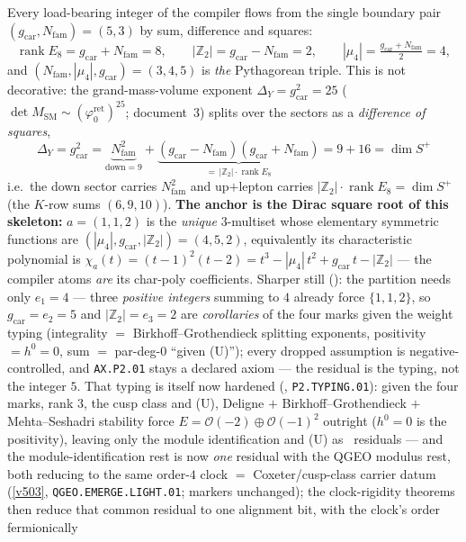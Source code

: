 \documentclass[11pt,a4paper]{article}
\newcommand{\gcar}{g_{\mathrm{car}}}
\newcommand{\Nfam}{N_{\mathrm{fam}}}
\newcommand{\phiz}{\varphi_0^{\mathrm{ret}}}
\newcommand{\Z}{\mathbb{Z}}
\theoremstyle{definition}
\begin{document}
\begin{keybox}[The whole integer skeleton from one pair $(\gcar,\Nfam)=(5,3)$ \mE\ (\veri{v53\_compiler\_core.py})]
Every load-bearing integer of the compiler flows from the single boundary pair
$(\gcar,\Nfam)=(5,3)$ by sum, difference and squares:
\[
  \operatorname{rank}E_8=\gcar{+}\Nfam=8,\qquad
  |\Z_2|=\gcar{-}\Nfam=2,\qquad
  |\mu_4|=\tfrac{\gcar+\Nfam}{2}=4,
\]
and $(\Nfam,|\mu_4|,\gcar)=(3,4,5)$ is \emph{the} Pythagorean triple. This is not decorative: the
grand-mass-volume exponent $\Delta_Y=\gcar^2=25$ ($\det M_{\mathrm{SM}}\sim(\phiz)^{25}$; document~3)
splits over the sectors as a \emph{difference of squares},
\[
  \boxed{\ \Delta_Y=\gcar^2
  =\underbrace{\Nfam^2}_{\text{down}=9}
  +\underbrace{(\gcar{-}\Nfam)(\gcar{+}\Nfam)}_{=\,|\Z_2|\cdot\operatorname{rank}E_8}
  =9+16=\dim S^+\ }
\]
i.e.\ the down sector carries $\Nfam^2$ and up$+$lepton carries $|\Z_2|\!\cdot\!\operatorname{rank}E_8=\dim S^+$
(the $K$-row sums $(6,9,10)$). \textbf{The anchor is the Dirac square root of this skeleton:} $a=(1,1,2)$ is
the \emph{unique} $3$-multiset whose elementary symmetric functions are $(|\mu_4|,\gcar,|\Z_2|)=(4,5,2)$,
equivalently its characteristic polynomial is
$\chi_a(t)=(t{-}1)^2(t{-}2)=t^3-|\mu_4|\,t^2+\gcar\,t-|\Z_2|$ --- the compiler atoms \emph{are} its
char-poly coefficients. Sharper still (): the partition needs only
$e_1=4$ --- three \emph{positive integers} summing to $4$ already force $\{1,1,2\}$, so $\gcar=e_2=5$ and
$|\Z_2|=e_3=2$ are \emph{corollaries} of the four marks given the weight typing (integrality $=$
Birkhoff--Grothendieck splitting exponents, positivity $=h^0{=}0$, sum $=$ par-deg-$0$ ``given (U)'');
every dropped assumption is negative-controlled, and \texttt{AX.P2.01} stays a declared axiom --- the
residual is the typing, not the integer $5$. That typing is itself now hardened
(, \texttt{P2.TYPING.01}): given the four marks, rank $3$, the cusp
class and (U), Deligne $+$ Birkhoff--Grothendieck $+$ Mehta--Seshadri stability force
$E=\mathcal O(-2)\oplus\mathcal O(-1)^2$ outright ($h^0{=}0$ is the positivity), leaving only the module
identification and (U) as \mC\ residuals --- and the module-identification rest is now \emph{one}
residual with the QGEO modulus rest, both reducing to the same order-$4$ clock $=$ Coxeter/cusp-class
carrier datum (\vref{v503}, \texttt{QGEO.EMERGE.LIGHT.01}; markers unchanged); the clock-rigidity
theorems then reduce that common residual to one alignment bit, with the clock's order fermionically

\end{keybox}
\end{document}
